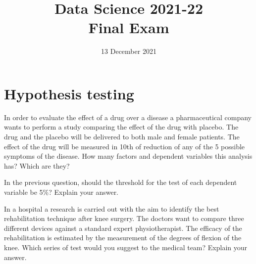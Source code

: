 \documentclass[11pt]{article}
\title{
\vspace{-1.2cm}
Data Science 2021-22\\ Final Exam}
\author{13 December 2021}
\date{}%
\newcounter{marks}
\begin{document}
\maketitle


\section*{Hypothesis testing}
\begin{list}{{\bf Question 1.:}}
	{
	}

\item
{}
\addtocounter{marks}{1}
In order to evaluate the effect of a drug over a disease a pharmaceutical company wants to perform a study comparing the effect of the drug with placebo. The drug and the placebo will be delivered to both male and female patients. The effect of the drug will be measured in 10th of reduction of any of the 5 possible symptoms of the disease. How many factors and dependent variables this analysis has? Which are they?

\item
{}
\addtocounter{marks}{1}
In the previous question, should the threshold for the test of each dependent variable be 5\%? Explain your answer.

\item
{}
\addtocounter{marks}{1}
In a hospital a research is carried out with the aim to identify the best rehabilitation technique after knee surgery. The doctors want to compare three different devices against a standard expert physiotherapist. The efficacy of the rehabilitation is estimated by the measurement of the degrees of flexion of the knee. Which series of test would you suggest to the medical team? Explain your answer.

\end{list}

\end{document}
